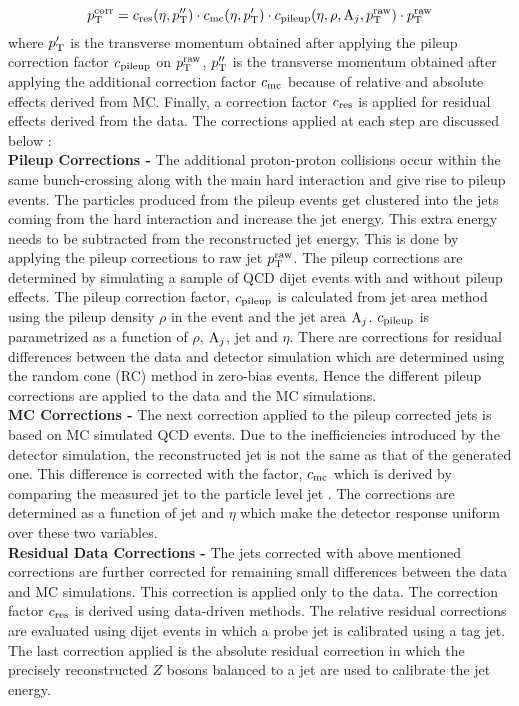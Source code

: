 \begin{equation}
p^{\rm corr}_{\rm T} = c_{\rm res}(\eta,p''_{\rm T})\cdot c_{\rm mc}(\eta,p'_{\rm T})\cdot c_{\rm pileup}(\eta,\rho,{\rm A}_{j},p^{\rm raw}_{\rm T})\cdot p^{\rm raw}_{\rm T}
\end{equation}
where $p'_{\rm T}$ is the transverse momentum obtained after applying the pileup correction factor $c_{\rm pileup}$ on $p^{\rm raw}_{\rm T}$, $p''_{\rm T}$ is the transverse momentum obtained after applying the additional correction factor $c_{\rm mc}$ because of relative and absolute effects derived from MC. Finally, a correction factor $c_{\rm res}$ is applied for residual effects derived from the data. The corrections applied at each step are discussed below : \\
{\bf Pileup Corrections -} The additional proton-proton collisions occur within the same bunch-crossing along with the main hard interaction and give rise to pileup events. The particles produced from the pileup events get clustered into the jets coming from the hard interaction and increase the jet energy. This extra energy needs to be subtracted from the reconstructed jet energy. This is done by applying the pileup corrections to raw jet $p^{\rm raw}_{\rm T}$. The pileup corrections are determined by simulating a sample of QCD dijet events with and without pileup effects. The pileup correction factor, $c_{\rm pileup}$ is calculated from jet area method using the pileup density $\rho$ in the event and the jet area ${\rm A}_{j}$. $c_{\rm pileup}$ is parametrized as a function of $\rho$, ${\rm A}_{j}$, jet \pt and $\eta$. There are corrections for residual differences between the data and detector simulation which are determined using the random cone (RC) method in zero-bias events. Hence the different pileup corrections are applied to the data and the MC simulations. \\ \newline
{\bf MC Corrections -} The next correction applied to the pileup corrected jets is based on MC simulated QCD events. Due to the inefficiencies introduced by the detector simulation, the reconstructed jet \pt is not the same as that of the generated one. This difference is corrected with the factor, $c_{\rm mc}$ which is derived by comparing the measured jet \pt to the particle level jet \pt. The corrections are determined as a function of jet \pt and $\eta$ which make the detector response uniform over these two variables. \\ \newline
{\bf Residual Data Corrections -} The jets corrected with above mentioned corrections are further corrected for remaining small differences between the data and MC simulations. This correction is applied only to the data. The correction factor $c_{\rm res}$ is derived using data-driven methods. The relative residual corrections are evaluated using dijet events in which a probe jet is calibrated using a tag jet. The last correction applied is the absolute residual correction in which the precisely reconstructed $Z$ bosons balanced to a jet are used to calibrate the jet energy. \\ \newline
